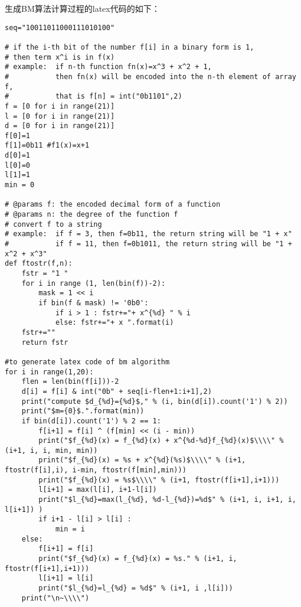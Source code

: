 \documentclass{article}
\begin{document}
生成BM算法计算过程的latex代码的如下：
\begin{lstlisting}[title=bm.py, frame=shadowbox,language={[ANSI]C++}, keywordstyle=\color{blue!70}, commentstyle=\color{red!50!green!50!blue!50}, escapeinside=``, basicstyle=\tiny]
seq="10011011000111010100"

# if the i-th bit of the number f[i] in a binary form is 1,
# then term x^i is in f(x)
# example: 	if n-th function fn(x)=x^3 + x^2 + 1, 
# 			then fn(x) will be encoded into the n-th element of array f, 
# 			that is f[n] = int("0b1101",2)
f = [0 for i in range(21)]
l = [0 for i in range(21)]
d = [0 for i in range(21)]
f[0]=1
f[1]=0b11 #f1(x)=x+1
d[0]=1
l[0]=0
l[1]=1
min = 0

# @params f: the encoded decimal form of a function
# @params n: the degree of the function f
# convert f to a string
# example: 	if f = 3, then f=0b11, the return string will be "1 + x"
# 			if f = 11, then f=0b1011, the return string will be "1 + x^2 + x^3" 
def ftostr(f,n):
	fstr = "1 "
	for i in range (1, len(bin(f))-2):
		mask = 1 << i
		if bin(f & mask) != '0b0':
			if i > 1 : fstr+="+ x^{%d} " % i 
			else: fstr+="+ x ".format(i)
	fstr+=""
	return fstr

#to generate latex code of bm algorithm
for i in range(1,20):
	flen = len(bin(f[i]))-2
	d[i] = f[i] & int("0b" + seq[i-flen+1:i+1],2)
	print("compute $d_{%d}={%d}$," % (i, bin(d[i]).count('1') % 2))
	print("$m={0}$.".format(min))
	if bin(d[i]).count('1') % 2 == 1:
		f[i+1] = f[i] ^ (f[min] << (i - min))
		print("$f_{%d}(x) = f_{%d}(x) + x^{%d-%d}f_{%d}(x)$\\\\" % (i+1, i, i, min, min))
		print("$f_{%d}(x) = %s + x^{%d}(%s)$\\\\" % (i+1, ftostr(f[i],i), i-min, ftostr(f[min],min)))
		print("$f_{%d}(x) = %s$\\\\" % (i+1, ftostr(f[i+1],i+1)))
		l[i+1] = max(l[i], i+1-l[i])
		print("$l_{%d}=max(l_{%d}, %d-l_{%d})=%d$" % (i+1, i, i+1, i, l[i+1]) )
		if i+1 - l[i] > l[i] : 
			min = i
	else:
		f[i+1] = f[i]
		print("$f_{%d}(x) = f_{%d}(x) = %s." % (i+1, i, ftostr(f[i+1],i+1)))
		l[i+1] = l[i]
		print("$l_{%d}=l_{%d} = %d$" % (i+1, i ,l[i]))
	print("\n~\\\\")
\end{lstlisting}
\end{document}
